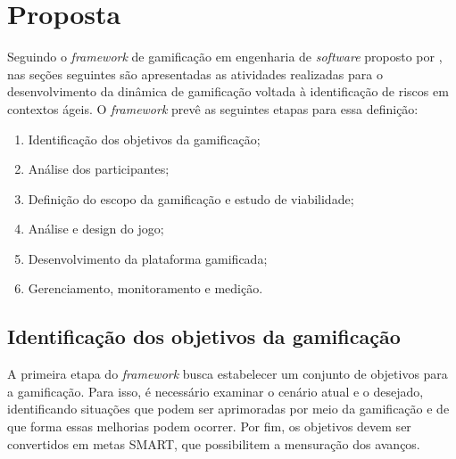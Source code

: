 \documentclass[
	12pt,
	openright,
	twoside,
	a4paper,
	english,
	brazil
	]{abntex2}
\begin{document}

\chapter{Proposta}
\label{cap:proposta}

Seguindo o \textit{framework} de gamificação em engenharia de \textit{software} proposto por , nas seções seguintes são apresentadas as atividades realizadas para o desenvolvimento da dinâmica de gamificação voltada à identificação de riscos em contextos ágeis. O \textit{framework} prevê as seguintes etapas para essa definição:

\begin{enumerate}
  \item Identificação dos objetivos da gamificação;
  \item Análise dos participantes; 
  \item Definição do escopo da gamificação e estudo de viabilidade;
  \item Análise e design do jogo; 
  \item Desenvolvimento da plataforma gamificada;
  \item Gerenciamento, monitoramento e medição. 
\end{enumerate}

\section{Identificação dos objetivos da gamificação}

A primeira etapa do \textit{framework} busca estabelecer um conjunto de objetivos para a gamificação. Para isso, é necessário examinar o cenário atual e o desejado, identificando situações que podem ser aprimoradas por meio da gamificação e de que forma essas melhorias podem ocorrer. Por fim, os objetivos devem ser convertidos em metas SMART, que possibilitem a mensuração dos avanços.
\end{document}
